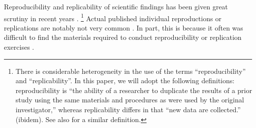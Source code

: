 Reproducibility and replicability of scientific findings has been given great scrutiny in recent years \parencite{CamererScience2016,Collaboration2015-ev,Klein2014,FanelliPNAS2018}.%
\footnote{There is considerable heterogeneity in the use of the terms
	``reproducibility'' and ``replicability''. In this paper, we will adopt
	the following definitions: reproducibility is ``the ability of a
	researcher to duplicate the results of a prior study using the same
	materials and procedures as were used by the original investigator,''
	\parencite{Bollen2015} whereas replicability
	differs in that ``new data are collected.'' (ibidem). See also \cite{NationalAcademiesofSciencesEngineeringandMedicine2019} for a similar definition.}
%
Actual published individual reproductions or replications are notably not very common \parencite[in economics, see][]{BellMiller2013b,Duvendack2017}. In part, this is because it often was difficult to find the materials required to conduct reproducibility or replication exercises \parencite{Dewald1986,McCullough2006,McCullough03}.  

